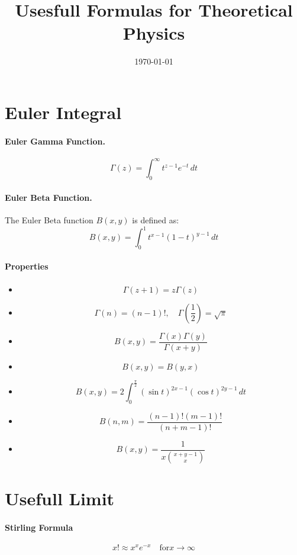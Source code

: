 \documentclass{article}
\begin{document}
\title{Usesfull Formulas for Theoretical Physics}
\date{\today}
\maketitle

\section{Euler Integral}
\paragraph{Euler Gamma Function.}
\[
\Gamma(z) = \int_{0}^{\infty} t^{z-1} e^{-t} \, dt
\]
\paragraph{Euler Beta Function.}
The Euler Beta function $B(x, y)$ is defined as:
\[
B(x, y) = \int_{0}^{1} t^{x-1} (1-t)^{y-1} \, dt
\]
\paragraph{Properties}
\begin{itemize}
    \item 
    \[
    \Gamma(z+1) = z \Gamma(z)
    \]
    \item 
    \[
    \Gamma(n) = (n-1)!, \quad \Gamma\left(\frac{1}{2}\right) = \sqrt{\pi}
    \]
    \item 
    \[
    B(x, y) = \frac{\Gamma(x)\Gamma(y)}{\Gamma(x+y)}
    \]
    \item 
    \[
    B(x, y) = B(y, x)
    \]
    \item
    \[
    B(x, y) = 2 \int_{0}^{\frac{\pi}{2}} (\sin t)^{2x-1} (\cos t)^{2y-1} \, dt
    \]
    \item
    \[
    B(n, m) = \frac{(n-1)!(m-1)!}{(n+m-1)!}
    \]
    \item 
    \[
    B(x, y) = \frac{1}{x \binom{x+y-1}{x}}
    \]
\end{itemize}

\section{Usefull Limit}
\paragraph{Stirling Formula}
\[
x! \approx x^{x} e^{-x} \quad \text{for} x \longrightarrow \infty 
\]
\end{document}
